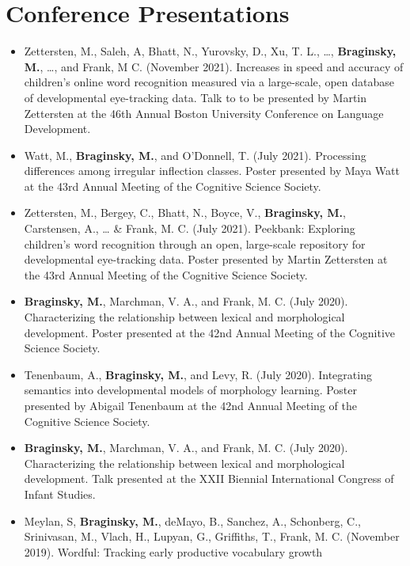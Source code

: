 \documentclass[11pt,]{article}
\begin{document}
\hypertarget{conference-presentations}{%
\section{Conference Presentations}\label{conference-presentations}}

\begin{itemize}
\item
  Zettersten, M., Saleh, A, Bhatt, N., Yurovsky, D., Xu, T. L., \ldots,
  \textbf{Braginsky, M.}, \ldots, and Frank, M C. (November 2021).
  Increases in speed and accuracy of children's online word recognition
  measured via a large-scale, open database of developmental
  eye-tracking data. Talk to to be presented by Martin Zettersten at the
  46th Annual Boston University Conference on Language Development.
\item
  Watt, M., \textbf{Braginsky, M.}, and O'Donnell, T. (July 2021).
  Processing differences among irregular inflection classes. Poster
  presented by Maya Watt at the 43rd Annual Meeting of the Cognitive
  Science Society.
\item
  Zettersten, M., Bergey, C., Bhatt, N., Boyce, V., \textbf{Braginsky,
  M.}, Carstensen, A., \ldots{} \& Frank, M. C. (July 2021). Peekbank:
  Exploring children's word recognition through an open, large-scale
  repository for developmental eye-tracking data. Poster presented by
  Martin Zettersten at the 43rd Annual Meeting of the Cognitive Science
  Society.
\item
  \textbf{Braginsky, M.}, Marchman, V. A., and Frank, M. C. (July 2020).
  Characterizing the relationship between lexical and morphological
  development. Poster presented at the 42nd Annual Meeting of the
  Cognitive Science Society.
\item
  Tenenbaum, A., \textbf{Braginsky, M.}, and Levy, R. (July 2020).
  Integrating semantics into developmental models of morphology
  learning. Poster presented by Abigail Tenenbaum at the 42nd Annual
  Meeting of the Cognitive Science Society.
\item
  \textbf{Braginsky, M.}, Marchman, V. A., and Frank, M. C. (July 2020).
  Characterizing the relationship between lexical and morphological
  development. Talk presented at the XXII Biennial International
  Congress of Infant Studies.
\item
  Meylan, S, \textbf{Braginsky, M.}, deMayo, B., Sanchez, A., Schonberg,
  C., Srinivasan, M., Vlach, H., Lupyan, G., Griffiths, T., Frank, M. C.
  (November 2019). Wordful: Tracking early productive vocabulary growth

\end{itemize}
\end{document}
